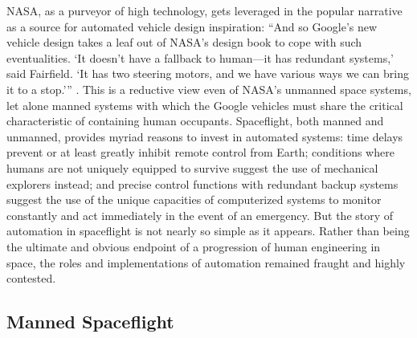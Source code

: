 
NASA, as a purveyor of high technology,
gets leveraged in the popular narrative as a source for
  automated vehicle design inspiration: ``And so Google's new vehicle
  design 
takes a leaf out of NASA's design book to cope with such
eventualities. `It doesn't have a fallback to human---it has redundant
systems,' said Fairfield. `It has two steering motors, and we have
various ways we can bring it to a stop.''' \cite{simonite}. This is a
reductive view even of NASA's unmanned space
systems, let alone manned systems with which the Google vehicles must share
the critical characteristic of containing human occupants.
Spaceflight, both manned and unmanned, provides myriad reasons to
invest in automated systems: time delays prevent or at least greatly
inhibit remote control from Earth; conditions where humans are not
uniquely equipped to survive suggest the use of mechanical explorers
instead; and precise control functions with redundant backup systems
suggest the use of the unique capacities of computerized systems to
monitor constantly and act immediately in the event of an emergency.
 But the story of automation in spaceflight is
not nearly so simple as it appears. Rather than being the ultimate and
obvious endpoint of a progression of human engineering in space, the
roles and implementations of automation remained fraught and highly
contested. 


\subsection{Manned Spaceflight}




